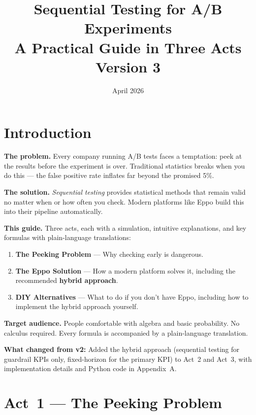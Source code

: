 \documentclass[12pt, a4paper]{article}
\title{\textbf{Sequential Testing for A/B Experiments}\\[6pt]
       \large A Practical Guide in Three Acts\\[4pt]
       \normalsize Version 3}
\author{}
\date{April 2026}
\begin{document}
\maketitle
\tableofcontents
\newpage

\section*{Introduction}

\textbf{The problem.}
Every company running A/B tests faces a temptation: peek at the results
before the experiment is over.  Traditional statistics breaks when you do
this --- the false positive rate inflates far beyond the promised 5\%.

\textbf{The solution.}
\emph{Sequential testing} provides statistical methods that remain valid
no matter when or how often you check.  Modern platforms like Eppo build
this into their pipeline automatically.

\textbf{This guide.}
Three acts, each with a simulation, intuitive explanations, and key formulas
with plain-language translations:
\begin{enumerate}[nosep]
  \item \textbf{The Peeking Problem} --- Why checking early is dangerous.
  \item \textbf{The Eppo Solution} --- How a modern platform solves it,
        including the recommended \textbf{hybrid approach}.
  \item \textbf{DIY Alternatives} --- What to do if you don't have Eppo,
        including how to implement the hybrid approach yourself.
\end{enumerate}

\textbf{Target audience.}
People comfortable with algebra and basic probability.  No calculus required.
Every formula is accompanied by a plain-language translation.

\textbf{What changed from v2:}
Added the hybrid approach (sequential testing for guardrail KPIs only,
fixed-horizon for the primary KPI) to Act~2 and Act~3, with implementation
details and Python code in Appendix~A.


\newpage
\section{Act~1 --- The Peeking Problem}
\end{document}
